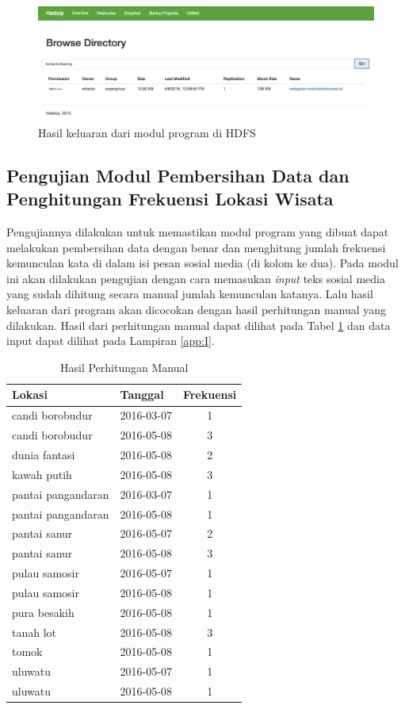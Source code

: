 \begin{figure}[H]
	\centering
	\includegraphics[scale=0.4]{Gambar/testing-instagram-02.png}
	\caption[Hasil keluaran dari modul program di HDFS]{Hasil keluaran dari modul program di HDFS} 
	\label{fig:testing_instagram_02}
\end{figure}

\subsection{Pengujian Modul Pembersihan Data dan Penghitungan Frekuensi Lokasi Wisata}
Pengujiannya dilakukan untuk memastikan modul program yang dibuat dapat melakukan pembersihan data dengan benar dan menghitung jumlah frekuensi kemunculan kata di dalam isi pesan sosial media (di kolom ke dua). Pada modul ini akan dilakukan pengujian dengan cara memasukan \textit{input} teks sosial media yang sudah dihitung secara manual jumlah kemunculan katanya. Lalu hasil keluaran dari program akan dicocokan dengan hasil perhitungan manual yang dilakukan. Hasil dari perhitungan manual dapat dilihat pada Tabel \ref{tab:hasil_hitung_manual} dan data input dapat dilihat pada Lampiran \ref{app:I}.

\begin{table}[!htb]
	\centering
	\begin{tabular}{| l | l | c |}
		\hline
		Lokasi & Tanggal & Frekuensi \\
	 	\hline
	 	candi borobudur & 2016-03-07 & 1\\
		candi borobudur & 2016-05-08 & 3\\
		dunia fantasi & 2016-05-08 & 2\\
		kawah putih & 2016-05-08 & 3\\
		pantai pangandaran & 2016-03-07 & 1\\
		pantai pangandaran & 2016-05-08 & 1\\
		pantai sanur & 2016-05-07 & 2\\
		pantai sanur & 2016-05-08 & 3\\
		pulau samosir & 2016-05-07 & 1\\
		pulau samosir & 2016-05-08 & 1\\
		pura besakih & 2016-05-08 & 1\\
		tanah lot & 2016-05-08 & 3\\
		tomok & 2016-05-08 & 1\\
		uluwatu & 2016-05-07 & 1\\
		uluwatu & 2016-05-08 & 1\\
	 	\hline
	\end{tabular}	
	\caption{Hasil Perhitungan Manual}\label{tab:hasil_hitung_manual}
\end{table}	

